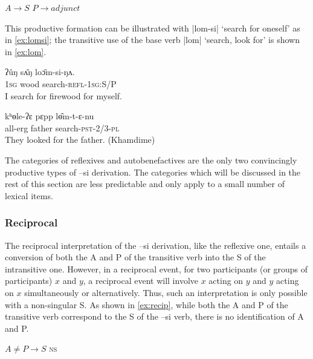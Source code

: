 \documentclass[twoside,a4paper,11pt]{article}
\newcommand{\ipa}[1]{{\phon#1}}
\begin{document}
\begin{exe}
\ex \label{ex:autoben}
\glt $A  \rightarrow S$
\glt $P  \rightarrow adjunct$
\end{exe}
 
This  productive formation can be illustrated with |\ipa{lom-si}| `search for oneself' as in \ref{ex:lomsi}; the transitive use of the base verb |\ipa{lom}| `search, look for' is shown in \ref{ex:lom}.

\begin{exe}
\ex \label{ex:lomsi} 
\gll
\ipa{ʔûŋ}  	\ipa{sʌ̄ŋ}  	\ipa{loɔ̄m-si-ŋʌ.}  \\
\textsc{1sg} wood search-\textsc{refl-1sg:S/P} \\
\glt I search for firewood for myself.
 \end{exe}
 
 \begin{exe}
\ex \label{ex:lom} 
\gll
 \ipa{kʰɵle-ʔɛ}  	\ipa{pɛpp}  	\ipa{lɵ̂m-t-ɛ-nu}  \\
 all-erg father search-\textsc{pst-2/3-pl} \\
 \glt They looked for the father. (Khamdime)
 \end{exe}
 
 

The categories of reflexives and autobenefactives are the only two  convincingly productive types of \ipa{–si} derivation.  The categories which will be discussed in the rest of this section are less predictable and only apply to a small number of lexical items.

\subsubsection{Reciprocal}
The reciprocal  interpretation of the \ipa{--si} derivation, like the reflexive one, entails a conversion of both the A and P of the transitive verb into the S of the intransitive one. However, in a reciprocal event, for two participants (or groups of participants) $x$ and $y$, a reciprocal event will involve $x$ acting on $y$ and $y$  acting on $x$ simultaneously or alternatively.  Thus, such an interpretation is only possible with a non-singular S. As shown in \ref{ex:recip}, while both the A and P of the transitive verb correspond to the S of the  \ipa{--si} verb, there is no identification of A and P.

 \begin{exe}
\ex \label{ex:recip}
\glt $A \neq P  \rightarrow S$ \textsc{ns}

\end{exe}
\end{document}
